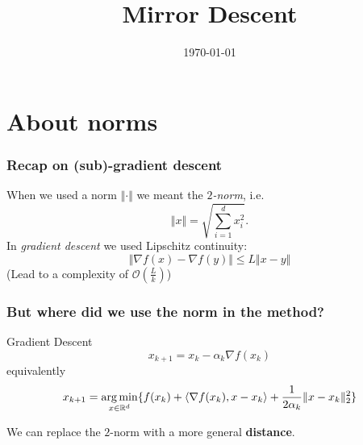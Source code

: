 \documentclass{beamer}
\title{Mirror Descent}
\date{\today}
\begin{document}
\maketitle
\frame{\tableofcontents[currentsection]}

\section{About norms}

\begin{frame}
  \frametitle{Recap on (sub)-gradient descent}

  When we used a norm $\Vert \cdot \Vert$ we meant the \emph{$2$-norm}, i.e.\
  \begin{equation}
    \Vert x \Vert = \sqrt{\sum_{i=1}^{d} x_i^2}.
  \end{equation}
  In \emph{gradient descent} we used Lipschitz continuity:
  \begin{equation}
    \Vert \nabla f(x) - \nabla f(y) \Vert \le L \Vert x-y \Vert
  \end{equation}
  (Lead to a complexity of $\mathcal{O}(\frac{L}{k})$) \\


\end{frame}

\begin{frame}
  \frametitle{But where did we use the norm in the method?}

  \begin{block}{Gradient Descent}
    \begin{equation}
      x_{k+1} = x_k - \alpha_k \nabla f(x_k)
    \end{equation}
    equivalently
    \begin{equation}
      x_{k+1} = \operatorname*{arg\,min}_{x \in \mathbb{R}^d} \{ f(x_k) + \langle \nabla f(x_k), x-x_k \rangle + \frac{1}{2 \alpha_k} \Vert x-x_k  \Vert_2^2\}
    \end{equation}
  \end{block}
  We can replace the $2$-norm with a more general \textbf{distance}.
\end{frame}
\end{document}
